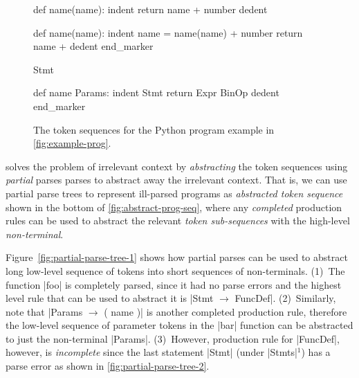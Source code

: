 \begin{figure}[t]
\centering
\begin{minipage}[t]{0.56\linewidth}
\centering
\begin{ecode}
def name(name): \n
indent return name + number \n
dedent \n

def name(name): \n
indent name = name(name) + number \n
return name + \n
dedent end_marker
\end{ecode}
\label{fig:prog-seq}
\end{minipage}%
\hspace{0.02\linewidth}%
\begin{minipage}[t]{0.42\linewidth}
\centering
\begin{ecode}
Stmt \n

def name Params: \n
indent Stmt \n
return Expr BinOp \n
dedent end_marker
\end{ecode}
\label{fig:abstract-prog-seq}
\end{minipage}
\caption{The token sequences for the Python program example in \autoref{fig:example-prog}.}
\end{figure}

%
\toolname solves the problem of irrelevant context
by \emph{abstracting} the token sequences using
\emph{partial} parses parses to abstract away
the irrelevant context.
%
That is, we can use partial parse trees to represent
ill-parsed programs as \emph{abstracted token sequence}
shown in the bottom of \autoref{fig:abstract-prog-seq},
where any \emph{completed} production rules can be used
to abstract the relevant \emph{token sub-sequences}
with the high-level \emph{non-terminal}.

Figure~\ref{fig:partial-parse-tree-1} shows how partial
parses can be used to abstract long low-level
sequence of tokens into short sequences of non-terminals.
%
(1)~The function |foo| is completely parsed,
since it had no parse errors and the highest
level rule that can be used to abstract it is
%
|Stmt $\rightarrow$ FuncDef|.
%
(2)~Similarly, note that |Params $\rightarrow$ ( name )|
is another completed production rule, therefore the
low-level sequence of  parameter tokens in the |bar|
function can be abstracted to just the non-terminal |Params|.
%
(3)~However, production rule for |FuncDef|, however, is
\emph{incomplete} since the last statement |Stmt| (under |Stmts|$^1$)
has a parse error as shown in \autoref{fig:partial-parse-tree-2}.

